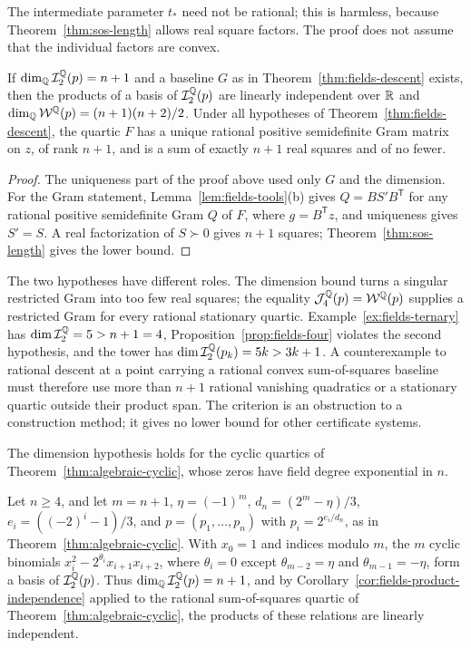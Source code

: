 The intermediate parameter $t_*$ need not be rational; this is harmless,
because Theorem~\ref{thm:sos-length} allows real square factors. The proof
does not assume that the individual factors are convex.

\begin{corollary}
\label{cor:fields-product-independence}
If $\dim_\mathbb Q\mathcal I_2^\mathbb Q(p)=n+1$ and a baseline $G$ as in
Theorem~\ref{thm:fields-descent} exists, then the products of a basis of
$\mathcal I_2^\mathbb Q(p)$ are linearly independent over $\mathbb R$ and
$\dim_\mathbb Q\mathcal W^\mathbb Q(p)=(n+1)(n+2)/2$. Under all hypotheses of
Theorem~\ref{thm:fields-descent}, the quartic $F$ has a unique rational
positive semidefinite Gram matrix on $z$, of rank $n+1$, and is a sum of
exactly $n+1$ real squares and of no fewer.
\end{corollary}

\begin{proof}
The uniqueness part of the proof above used only $G$ and the dimension. For
the Gram statement, Lemma~\ref{lem:fields-tools}(b) gives
$Q=BS'B^{\mathsf T}$ for any rational positive semidefinite Gram $Q$ of $F$,
where $g=B^{\mathsf T}z$, and uniqueness gives $S'=S$. A real factorization of
$S\succ0$ gives $n+1$ squares; Theorem~\ref{thm:sos-length} gives the lower
bound.
\end{proof}

The two hypotheses have different roles. The dimension bound turns a
singular restricted Gram into too few real squares; the equality
$\mathcal J_4^\mathbb Q(p)=\mathcal W^\mathbb Q(p)$ supplies a restricted Gram for every
rational stationary quartic. Example~\ref{ex:fields-ternary} has
$\dim\mathcal I_2^\mathbb Q=5>n+1=4$, Proposition~\ref{prop:fields-four} violates
the second hypothesis, and the tower has $\dim\mathcal I_2^\mathbb Q(p_k)=5k>3k+1$.
A counterexample to rational descent at a point carrying a rational convex
sum-of-squares baseline must therefore use more than $n+1$ rational
vanishing quadratics or a stationary quartic outside their product span. The
criterion is an obstruction to a construction method; it gives no lower
bound for other certificate systems.

The dimension hypothesis holds for the cyclic quartics of
Theorem~\ref{thm:algebraic-cyclic}, whose zeros have field degree
exponential in $n$.

\begin{proposition}
\label{prop:fields-cyclic}
Let $n\ge4$, and let $m=n+1$, $\eta=(-1)^m$, $d_n=(2^m-\eta)/3$,
$e_i=((-2)^i-1)/3$, and $p=(p_1,\ldots,p_n)$ with $p_i=2^{e_i/d_n}$, as in
Theorem~\ref{thm:algebraic-cyclic}. With $x_0=1$ and indices modulo $m$, the
$m$ cyclic binomials $x_i^2-2^{\theta_i}x_{i+1}x_{i+2}$, where $\theta_i=0$
except $\theta_{m-2}=\eta$ and $\theta_{m-1}=-\eta$, form a basis of
$\mathcal I_2^\mathbb Q(p)$. Thus $\dim_\mathbb Q\mathcal I_2^\mathbb Q(p)=n+1$, and by
Corollary~\ref{cor:fields-product-independence} applied to the rational
sum-of-squares quartic of Theorem~\ref{thm:algebraic-cyclic}, the products of
these relations are linearly independent.
\end{proposition}

